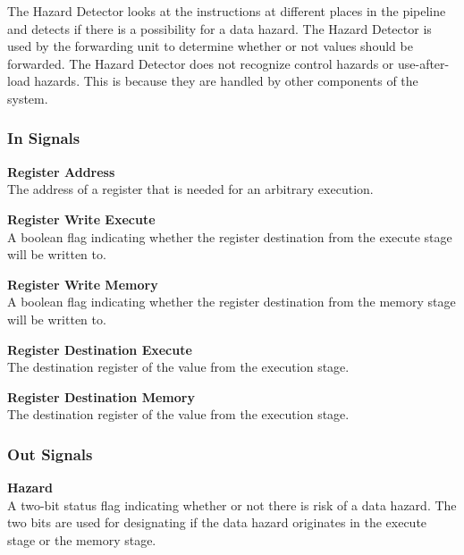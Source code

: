 The Hazard Detector looks at the instructions at different places in the pipeline and detects if there is a possibility for a data hazard.
The Hazard Detector is used by the forwarding unit to determine whether or not values should be forwarded.
The Hazard Detector does not recognize control hazards or use-after-load hazards.
This is because they are handled by other components of the system.

\subsubsection{In Signals}

\begin{description}
\item{\textbf{Register Address}} \\
    The address of a register that is needed for an arbitrary execution.

\item{\textbf{Register Write Execute}} \\
    A boolean flag indicating whether the register destination from the execute stage will be written to.

\item{\textbf{Register Write Memory}} \\
    A boolean flag indicating whether the register destination from the memory stage will be written to.

\item{\textbf{Register Destination Execute}} \\
    The destination register of the value from the execution stage.
\item{\textbf{Register Destination Memory}} \\
    The destination register of the value from the execution stage.

\end{description}

\subsubsection{Out Signals}

\begin{description}
\item{\textbf{Hazard}} \\
    A two-bit status flag indicating whether or not there is risk of a data hazard. The two bits are used for designating if the data hazard originates in the execute stage or the memory stage.
\end{description}

